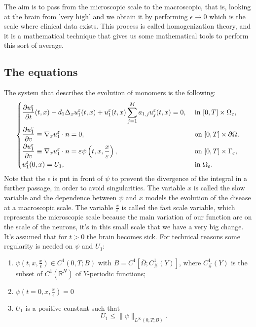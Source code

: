 The aim is to pass from the microscopic scale to the macroscopic, that is, looking at the brain from 'very high' and we obtain it by performing $\epsilon \rightarrow 0$ which is the scale where clinical data exists. This process is called homogenization theory, and it is a mathematical technique that gives us some mathematical tools to perform this sort of average.
\subsection{The equations}
The system that describes the evolution of monomers is the following:
\begin{equation}
    \begin{dcases}
    \frac{\partial u_{1}^{\epsilon}}{\partial t}(t, x)-d_{1} \Delta_{x} u_{1}^{\epsilon}(t, x)+u_{1}^{\epsilon}(t, x) \sum_{j=1}^{M} a_{1, j} u_{j}^{\epsilon}(t, x)=0, & \text { in }[0, T] \times \Omega_{\epsilon},\\
    \frac{\partial u^{\epsilon}_1}{\partial v} \equiv \nabla_{x} u^{\epsilon}_1\cdot n=0, & \text { on }[0, T]\times\partial\Omega,\\
    \frac{\partial u^{\epsilon}_{1}}{\partial v} \equiv \nabla_{x} u^{\epsilon}_1 \cdot n=\epsilon \psi\left(t, x,\frac{x}{\epsilon}\right), & \text { on }[0, T] \times \Gamma_{\epsilon},\\
    u_{1}^{\epsilon}(0, x)=U_{1}, & \text{ in }\Omega_{\epsilon}.
    \end{dcases}
\label{eq:u_1_eqs}\end{equation}
Note that the $\epsilon$ is put in front of $\psi$ to prevent the divergence of the integral in a further passage, in order to avoid singularities. 
The variable $x$ is called the slow variable and the dependence between $\psi$ and $x$ models the evolution of the disease at a macroscopic scale. The variable
$\frac{x}{\epsilon}$ is called the fast scale variable, which represents the microscopic scale because the main variation of our function are on the scale of the neurons, it's in this small scale that we have a very big change.\\
It's assumed that for $t>0$ the brain becomes sick. For technical reasons some regularity is needed on $\psi$ and $U_1$:
\begin{enumerate}
    \item $\psi\left(t, x, \frac{x}{\epsilon}\right) \in C^{1}(0, T ; B)$ with $B=C^{1}\left[\bar{\Omega} ; C_{\text {\# }}^{1}(Y)\right]$, where $C_{\#}^{1}(Y)$ is the subset of $C^{1}\left(\mathbb{R}^{N}\right)$ of $Y$-periodic functions;
    \item $\psi\left(t=0, x, \frac{x}{\epsilon}\right)=0$
    \item 
$U_{1}$ is a positive constant such that
\begin{equation}
  U_{1} \leq\|\psi\|_{L^{\infty}(0, T ; B)} .
\label{eq:U_1_norm}\end{equation}
\end{enumerate}
